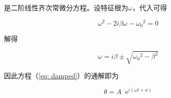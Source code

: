 \documentclass[a4paper,11pt]{article}
\newcommand*{\e}{\mathop{}\!\mathrm{e}}
\begin{document}
        是二阶线性齐次常微分方程。设特征根为$\omega$，代入可得

        \begin{equation}
            \omega^2 - 2i\beta \omega - {\omega_0}^2 = 0
        \end{equation}

        解得

        \begin{equation}
            \omega = i\beta \pm \sqrt{{\omega_0}^2 - \beta^2}
        \end{equation}
        
        因此方程（\ref{eq: damped}）的通解即为

        \begin{equation}
            \theta = A\e^{i(\omega t + \phi)}
        \end{equation}
\end{document}

